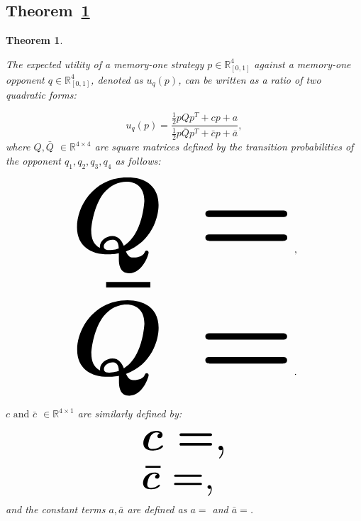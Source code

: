 \documentclass[10pt]{article}
\newcommand{\R}{\mathbb{R}}
\newtheorem{theorem}{Theorem}
\begin{document}
\subsection{Theorem~\ref{theorem_one}}
\begin{theorem}\label{theorem_one}

    The expected utility of a memory-one strategy \(p\in\mathbb{R}_{[0,1]}^4\)
    against a memory-one opponent \(q\in\mathbb{R}_{[0,1]}^4\), denoted
    as \(u_q(p)\), can be written as a ratio of two quadratic forms:

    \begin{equation}\label{eq:optimisation_quadratic}
    u_q(p) = \frac{\frac{1}{2}pQp^T + cp + a}
                {\frac{1}{2}p\bar{Q}p^T + \bar{c}p + \bar{a}},
    \end{equation}
    where \(Q, \bar{Q}\) \(\in \R^{4\times4}\) are square matrices defined by the
    transition probabilities of the opponent \(q_1, q_2, q_3, q_4\) as follows:

    \begin{center}
    \begin{equation}
    \resizebox{.65\linewidth}{!}{\arraycolsep=2.5pt%
    \boldmath\(
    Q = \)},
    \end{equation}
    \begin{equation}\label{eq:q_bar_matrix}
    \resizebox{.65\linewidth}{!}{\arraycolsep=2.5pt%
    \boldmath\(
    \bar{Q} =  \)}.
    \end{equation}
    \end{center}

    \(c \text{ and } \bar{c}\) \(\in \R^{4 \times 1}\) are similarly defined by:

    \begin{equation}\label{eq:q_matrix_numerator}
    \resizebox{0.25\linewidth}{!}{\arraycolsep=2.5pt%
    \boldmath\(c = \),}
    \end{equation}
    \begin{equation}\label{eq:q_matrix_denominator}
    \resizebox{0.25\linewidth}{!}{\arraycolsep=2.5pt%
    \boldmath\(\bar{c} = \),
    }
    \end{equation}
    and the constant terms \(a, \bar{a}\) are defined as \(a = \) and
    \(\bar{a} = \).
\end{theorem}
\end{document}
